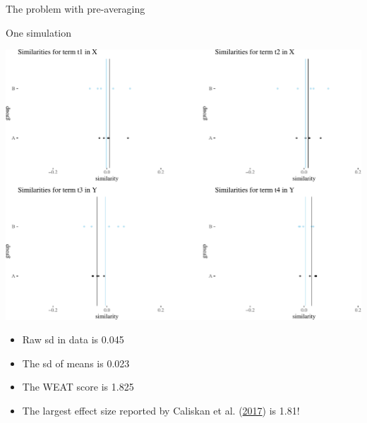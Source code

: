 \documentclass[10pt,ignorenonframetext,x11names, dvipsnames, bibspacing,natbib]{beamer}
\providecommand{\tightlist}{%
  \setlength{\itemsep}{0pt}\setlength{\parskip}{0pt}}
\begin{document}
\begin{frame}{The problem with pre-averaging}
\protect\hypertarget{the-problem-with-pre-averaging-1}{}

\begin{block}{One simulation}

\vspace{1mm}
\footnotesize

\begin{center}\includegraphics[width=0.7\linewidth]{presentationESSLLI_files/figure-beamer/unnamed-chunk-6-1} \end{center}
\normalsize

\vspace{1mm}
\footnotesize

\normalsize
\pause

\footnotesize

\vspace{-2mm}

\begin{itemize}
\tightlist
\item
  Raw sd in data is 0.045
\item
  The sd of means is 0.023
\item
  The WEAT score is 1.825
\item
  The largest effect size reported by Caliskan et al.
  (\protect\hyperlink{ref-Caliskan2017semanticsBiases}{2017}) is 1.81!
\end{itemize}

\end{block}

\end{frame}
\end{document}
